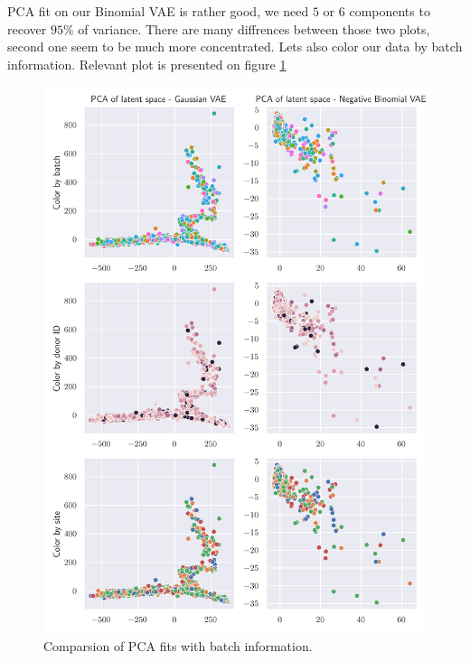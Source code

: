 \documentclass[12pt,a4paper]{article}
\begin{document}
PCA fit on our Binomial VAE is rather good, we need $5$ or $6$ components to recover $95\%$ of variance. There are many diffrences between those
two plots, second one seem to be much more concentrated.
Lets also color our data by batch information.
Relevant plot is presented on figure \ref{fig:compare_batch}
\begin{figure}[H]
    \begin{center}
        \includegraphics{src/compare_ext.png}
    \end{center}
    \caption{Comparsion of PCA fits with batch information.}
    \label{fig:compare_batch}
\end{figure}
\end{document}
